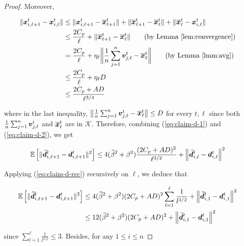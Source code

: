 \begin{proof}
%
Moreover, 

\begin{align}	
\| \vect{x}^{t}_{i,\ell+1} - \vect{x}^{t}_{i,\ell}\| 
&\leq \| \vect{x}^{t}_{i,\ell+1} - \overline{\vect{x}}^{t}_{\ell+1} \| +  \| \overline{\vect{x}}^{t}_{\ell+1} - \overline{\vect{x}}^{t}_{\ell} \|
	+ \| \overline{\vect{x}}^{t}_{\ell} - \vect{x}^{t}_{i,\ell} \|	\notag \\
&\leq \frac{2C_{p}}{\ell} 
	+ \| \overline{\vect{x}}^{t}_{\ell+1} - \overline{\vect{x}}^{t}_{\ell} \|  \tag{by Lemma~\ref{lem:convergence}} \\
&= \frac{2C_{p}}{\ell} 
	+ \eta_{\ell} \biggl \| \frac{1}{n} \sum_{j=1}^{n} \vect{v}^{t}_{j,\ell} - \overline{\vect{x}}^{t}_{\ell} \biggr \|
 		\tag{by Lemma~\ref{lmm:avg}} \\
&\leq \frac{2C_{p}}{\ell} + \eta_{\ell} D \\
%
&\leq \frac{2C_{p} + AD}{\ell^{3/4}}	\label{eq:claim-d-2}
\end{align}

where in the last inequality, $ \bigl \| \frac{1}{n} \sum_{j=1}^{n} \bm{v}^{t}_{j,\ell} - \overline{\bm{x}}^{t}_{\ell} \bigr \| \leq D$ 
for every $t,\ell$ since both $\frac{1}{n} \sum_{j=1}^{n} \bm{v}^{t}_{j,\ell}$ and $\overline{\bm{x}}^{t}_{\ell}$ are in $\mathcal{K}$. 
Therefore, combining (\ref{eq:claim-d-1}) and (\ref{eq:claim-d-2}), we get 

\begin{align}	\label{eq:claim-d-rec}
\mathbb{E} \left[  \| \widetilde{\bm{d}}^t_{i,\ell + 1} - \bm{d}^t_{i,\ell+1} \|^2 \right] 
\leq 4 (\widetilde{\beta}^{2} + \beta^{2}) \frac{(2C_{p} + AD)^{2}}{\ell^{3/2}}
	+  \left  \| \widetilde{\bm{d}}^t_{i,\ell} - \bm{d}^t_{i,\ell} \right \|^2 
\end{align}

Applying (\ref{eq:claim-d-rec}) recursively on $\ell$, we deduce that

\begin{align*}
\mathbb{E} \left[  \| \widetilde{\bm{d}}^t_{i,\ell + 1} - \bm{d}^t_{i,\ell+1} \|^2 \right] 
&\leq 4 (\widetilde{\beta}^{2} + \beta^{2})(2C_{p} + AD)^{2} \sum_{l=1}^{\ell} \frac{1}{l^{3/2}}
	+  \left  \| \widetilde{\bm{d}}^t_{i,1} - \bm{d}^t_{i,1} \right \|^2 \\
&\leq 12 (\widetilde{\beta}^{2} + \beta^{2})(2C_{p} + AD)^{2}
	+  \left  \| \widetilde{\bm{d}}^t_{i,1} - \bm{d}^t_{i,1} \right \|^2
\end{align*}

since $ \sum_{l=1}^{\ell} \frac{1}{l^{3/2}}  \leq 3$.
Besides, for any $1 \leq i \leq n$


\end{proof}
